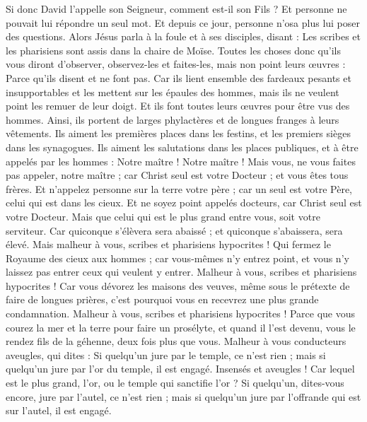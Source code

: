 \begin{multicols}{2}
Si donc David l'appelle son Seigneur, comment est-il son Fils ?
Et personne ne pouvait lui répondre un seul mot. Et depuis ce jour, personne n'osa plus lui poser des questions.
\VerseOne{}Alors Jésus parla à la foule et à ses disciples,
disant : Les scribes et les pharisiens sont assis dans la chaire de Moïse.
Toutes les choses donc qu'ils vous diront d'observer, observez-les et faites-les, mais non point leurs œuvres : Parce qu'ils disent et ne font pas.
Car ils lient ensemble des fardeaux pesants et insupportables et les mettent sur les épaules des hommes, mais ils ne veulent point les remuer de leur doigt.
Et ils font toutes leurs œuvres pour être vus des hommes. Ainsi, ils portent de larges phylactères et de longues franges à leurs vêtements.
Ils aiment les premières places dans les festins, et les premiers sièges dans les synagogues.
Ils aiment les salutations dans les places publiques, et à être appelés par les hommes : Notre maître ! Notre maître !
Mais vous, ne vous faites pas appeler, notre maître ; car Christ seul est votre Docteur ; et vous êtes tous frères.
Et n'appelez personne sur la terre votre père ; car un seul est votre Père, celui qui est dans les cieux.
Et ne soyez point appelés docteurs, car Christ seul est votre Docteur.
Mais que celui qui est le plus grand entre vous, soit votre serviteur.
Car quiconque s'élèvera sera abaissé ; et quiconque s'abaissera, sera élevé.
Mais malheur à vous, scribes et pharisiens hypocrites ! Qui fermez le Royaume des cieux aux hommes ; car vous-mêmes n'y entrez point, et vous n'y laissez pas entrer ceux qui veulent y entrer.
Malheur à vous, scribes et pharisiens hypocrites ! Car vous dévorez les maisons des veuves, même sous le prétexte de faire de longues prières, c'est pourquoi vous en recevrez une plus grande condamnation.
Malheur à vous, scribes et pharisiens hypocrites ! Parce que vous courez la mer et la terre pour faire un prosélyte, et quand il l'est devenu, vous le rendez fils de la géhenne, deux fois plus que vous.
Malheur à vous conducteurs aveugles, qui dites : Si quelqu'un jure par le temple, ce n'est rien ; mais si quelqu'un jure par l'or du temple, il est engagé.
Insensés et aveugles ! Car lequel est le plus grand, l'or, ou le temple qui sanctifie l'or ?
Si quelqu'un, dites-vous encore, jure par l'autel, ce n'est rien ; mais si quelqu'un jure par l'offrande qui est sur l'autel, il est engagé.

\end{multicols}
